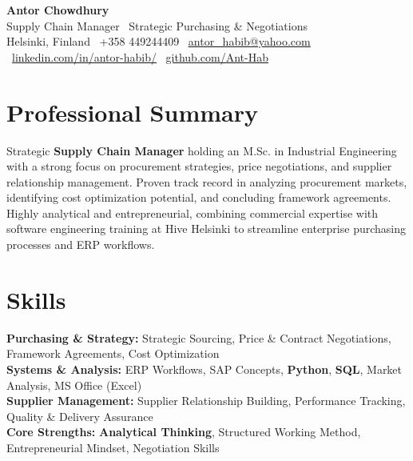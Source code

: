 \documentclass[a4paper,11pt]{article}
\begin{document}
\vspace*{2pt}

\begin{center}
    {\Huge {}\selectfont \textbf{Antor Chowdhury}} \\[4pt]
    {\large {}\selectfont Supply Chain Manager \textbar\ Strategic Purchasing \& Negotiations} \\[4pt]
    \small
    Helsinki, Finland \textbar\ +358 449244409 \textbar\ 
    \href{mailto:antor_habib@yahoo.com}{\underline{antor\_habib@yahoo.com}} \textbar\ 
    \href{https://www.linkedin.com/in/antor-habib/}{\underline{linkedin.com/in/antor-habib/}} \textbar\ 
    \href{https://github.com/Ant-Hab}{\underline{github.com/Ant-Hab}}
\end{center}

\vspace{-4pt}

\section{Professional Summary}
\begin{justify}
\small{
Strategic \textbf{Supply Chain Manager} holding an M.Sc. in Industrial Engineering with a strong focus on procurement strategies, price negotiations, and supplier relationship management. Proven track record in analyzing procurement markets, identifying cost optimization potential, and concluding framework agreements. Highly analytical and entrepreneurial, combining commercial expertise with software engineering training at Hive Helsinki to streamline enterprise purchasing processes and ERP workflows.
}
\end{justify}

\vspace{-6pt}

\section{Skills}
\begin{itemize}[leftmargin=0.15in, label={}, itemsep=0pt, topsep=1pt]
\small{\item{
\textbf{Purchasing \& Strategy:} Strategic Sourcing, Price \& Contract Negotiations, Framework Agreements, Cost Optimization \\
\textbf{Systems \& Analysis:} ERP Workflows, SAP Concepts, \textbf{Python}, \textbf{SQL}, Market Analysis, MS Office (Excel) \\
\textbf{Supplier Management:} Supplier Relationship Building, Performance Tracking, Quality \& Delivery Assurance \\
\textbf{Core Strengths:} \textbf{Analytical Thinking}, Structured Working Method, Entrepreneurial Mindset, Negotiation Skills
}}
\end{itemize}
\end{document}
